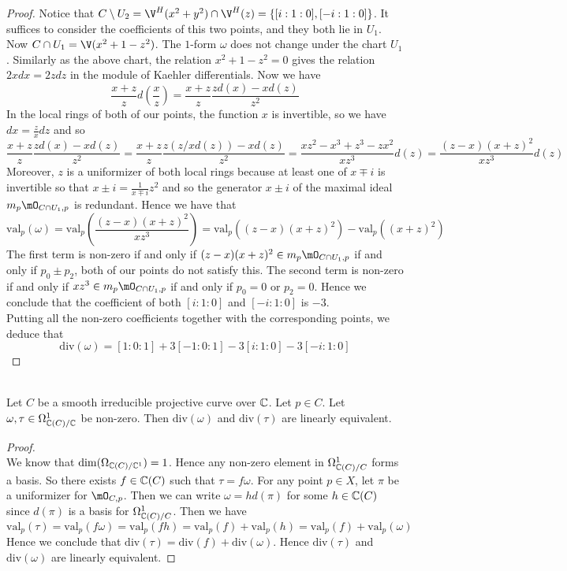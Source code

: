 \documentclass[a4paper]{article}
\begin{document}
\begin{eg}{}{}
\begin{proof}
Notice that $C\setminus U_2=\V^H(x^2+y^2)\cap\V^H(z)=\{[i:1:0],[-i:1:0]\}$. It suffices to consider the coefficients of this two points, and they both lie in $U_1$. Now $C\cap U_1=\V(x^2+1-z^2)$. The $1$-form $\omega$ does not change under the chart $U_1$. Similarly as the above chart, the relation $x^2+1-z^2=0$ gives the relation $2xdx=2zdz$ in the module of Kaehler differentials. Now we have $$\frac{x+z}{z}d\left(\frac{x}{z}\right)=\frac{x+z}{z}\frac{zd(x)-xd(z)}{z^2}$$ In the local rings of both of our points, the function $x$ is invertible, so we have $dx=\frac{z}{x}dz$ and so $$\frac{x+z}{z}\frac{zd(x)-xd(z)}{z^2}=\frac{x+z}{z}\frac{z(z/xd(z))-xd(z)}{z^2}=\frac{xz^2-x^3+z^3-zx^2}{xz^3}d(z)=\frac{(z-x)(x+z)^2}{xz^3}d(z)$$ Moreover, $z$ is a uniformizer of both local rings because at least one of $x\mp i$ is invertible so that $x\pm i=\frac{1}{x\mp i}z^2$ and so the generator $x\pm i$ of the maximal ideal $m_p\mO_{C\cap U_1,p}$ is redundant. Hence we have that $$\text{val}_p(\omega)=\text{val}_p\left(\frac{(z-x)(x+z)^2}{xz^3}\right)=\text{val}_p((z-x)(x+z)^2)-\text{val}_p((x+z)^2)$$ The first term is non-zero if and only if $(z-x)(x+z)^2\in m_p\mO_{C\cap U_1,p}$ if and only if $p_0\pm p_2$, both of our points do not satisfy this. The second term is non-zero if and only if $xz^3\in m_p\mO_{C\cap U_1,p}$ if and only if $p_0=0$ or $p_2=0$. Hence we conclude that the coefficient of both $[i:1:0]$ and $[-i:1:0]$ is $-3$. \\

Putting all the non-zero coefficients together with the corresponding points, we deduce that $$\text{div}(\omega)=[1:0:1]+3[-1:0:1]-3[i:1:0]-3[-i:1:0]$$
\end{proof}
\end{eg}

\begin{prp}{}{}\\
Let $C$ be a smooth irreducible projective curve over $\mathbb{C}$. Let $p\in C$. Let $\omega,\tau\in\Omega_{\mathbb{C}(C)/\mathbb{C}}^1$ be non-zero. Then $\text{div}(\omega)$ and $\text{div}(\tau)$ are linearly equivalent. 
\begin{proof}\\
We know that $\dim(\Omega_{\mathbb{C}(C)/\mathbb{C}^1})=1$. Hence any non-zero element in $\Omega_{\mathbb{C}(C)/C}^1$ forms a basis. So there exists $f\in\mathbb{C}(C)$ such that $\tau=f\omega$. For any point $p\in X$, let $\pi$ be a uniformizer for $\mO_{C,p}$. Then we can write $\omega=hd(\pi)$ for some $h\in\mathbb{C}(C)$ since $d(\pi)$ is a basis for $\Omega_{\mathbb{C}(C)/C}^1$. Then we have $$\text{val}_p(\tau)=\text{val}_p(f\omega)=\text{val}_p(fh)=\text{val}_p(f)+\text{val}_p(h)=\text{val}_p(f)+\text{val}_p(\omega)$$ Hence we conclude that $\text{div}(\tau)=\text{div}(f)+\text{div}(\omega)$. Hence $\text{div}(\tau)$ and $\text{div}(\omega)$ are linearly equivalent. 
\end{proof}
\end{prp}
\end{document}
